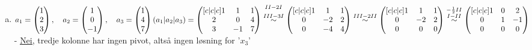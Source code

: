 \documentclass{article}
\newcommand{\vect}[1]{\begin{pmatrix} #1 \end{pmatrix}}
\newcommand{\uu}[1]{\underline{\underline{#1}}}
\newcommand{\eqqto}[1]{\overset{\substack{#1}}{\sim}}
\begin{document}
\begin{enumerate}[a)]
    \vspace{5em}
    (ikke oblig)
    \vspace{1em}
    \item \(a_1=\vect{1\\2\\3}, \quad a_2=\vect{1\\0\\-1}, \quad a_3=\vect{1\\4\\7} \\\\\\
    (a_1|a_2|a_3) = 
    \begin{pmatrix}[c|c|c]
        1&1&1\\
        2&0&4\\
        3&-1&7
    \end{pmatrix}
    \eqqto{II-2I\\\\III-3I}
    \begin{pmatrix}[c|c|c]
        1&1&1\\
        0&-2&2\\
        0&-4&4
    \end{pmatrix}
    \eqqto{III-2II}
    \begin{pmatrix}[c|c|c]
        1&1&1\\
        0&-2&2\\
        0&0&0
    \end{pmatrix}
    \eqqto{-\frac{1}{2}II\\I-II}
    \begin{pmatrix}[c|c|c]
        1&0&2\\
        0&1&-1\\
        0&0&0
    \end{pmatrix}
    \\\\\\\)
    - \uu{Nei}, tredje kolonne har ingen pivot, altså ingen løsning for '$x_3$'


\end{enumerate}
\end{document}
